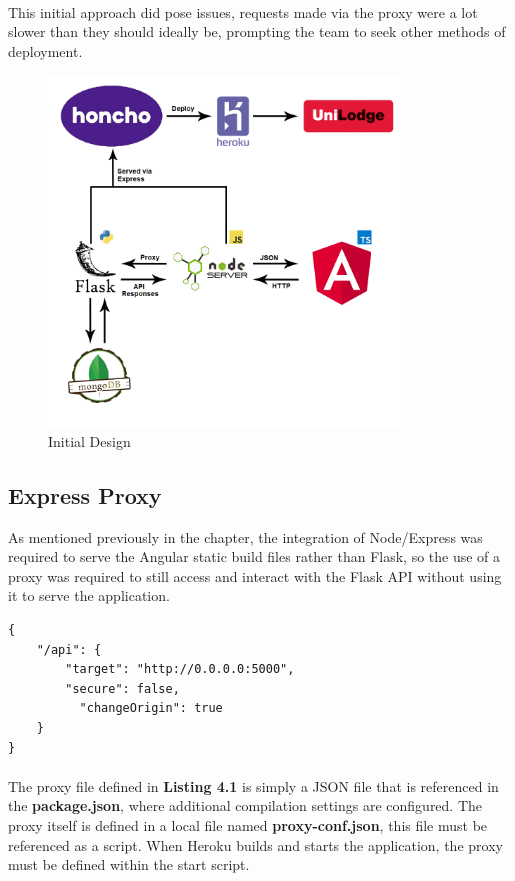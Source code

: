 \paragraph{}
This initial approach did pose issues, requests made via the proxy were a lot slower than they should ideally be, prompting the team to seek other methods of deployment.

\begin{figure}[H]
	\caption{Initial Design\newline}
	\label{image:design}
	\centering
	\includegraphics[width=0.83\textwidth]{images/design.png}
\end{figure}	

\subsection{Express Proxy}
As mentioned previously in the chapter, the integration of Node/Express was required to serve the Angular static build files rather than Flask, so the use of a proxy was required to still access and interact with the Flask API without using it to serve the application.
\newline

\begin{lstlisting}[caption=API Proxy]
{
    "/api": {
        "target": "http://0.0.0.0:5000",
        "secure": false, 
    	  "changeOrigin": true
    }
}
\end{lstlisting}

\paragraph{}
The proxy file defined in \textbf{Listing 4.1} is simply a JSON file that is referenced in the \textbf{package.json}, where additional compilation settings are configured. The proxy itself is defined in a local file named \textbf{proxy-conf.json}, this file must be referenced as a script. When Heroku builds and starts the application, the proxy must be defined within the start script. 

